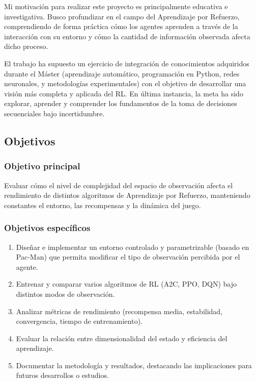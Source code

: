 \documentclass[12pt,a4paper,twoside,openany]{book}
\begin{document}
Mi motivación para realizar este proyecto es principalmente educativa e investigativa.
Busco profundizar en el campo del Aprendizaje por Refuerzo, comprendiendo de forma práctica cómo los agentes aprenden a través de la interacción con su entorno y cómo la cantidad de información observada afecta dicho proceso.

El trabajo ha supuesto un ejercicio de integración de conocimientos adquiridos durante el Máster (aprendizaje automático, programación en Python, redes neuronales, y metodologías experimentales) con el objetivo de desarrollar una visión más completa y aplicada del RL.
En última instancia, la meta ha sido explorar, aprender y comprender los fundamentos de la toma de decisiones secuenciales bajo incertidumbre.

\subsection{Objetivos}

\subsubsection{Objetivo principal}

Evaluar cómo el nivel de complejidad del espacio de observación afecta el rendimiento de distintos algoritmos de Aprendizaje por Refuerzo, manteniendo constantes el entorno, las recompensas y la dinámica del juego.

\subsubsection{Objetivos específicos}

\begin{enumerate}
    \item Diseñar e implementar un entorno controlado y parametrizable (basado en Pac-Man) que permita modificar el tipo de observación percibida por el agente.
    \item Entrenar y comparar varios algoritmos de RL (A2C, PPO, DQN) bajo distintos modos de observación.
    \item Analizar métricas de rendimiento (recompensa media, estabilidad, convergencia, tiempo de entrenamiento).
    \item Evaluar la relación entre dimensionalidad del estado y eficiencia del aprendizaje.
    \item Documentar la metodología y resultados, destacando las implicaciones para futuros desarrollos o estudios.
\end{enumerate}
\end{document}
